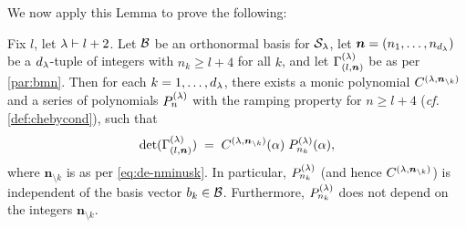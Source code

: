 We now apply this Lemma to prove the following:

\begin{lemma}\label{lem:pl} Fix $l$, let $\lambda \vdash l+2$. Let $\mathcal{B}$ be an orthonormal basis for $\mathcal{S}_\lambda$, let $\bm{n}=(n_1,\dots, n_{d_\lambda})$ be a $d_\lambda$-tuple of integers with $n_k\geq l+4$ for all $k$, and let $\Gamma_{(l,\bm{n})}^{(\lambda)}$ be as per \ref{par:bmn}. Then for each $k=1,\dots, d_\lambda$, there exists a monic polynomial $C^{(\lambda,\bm{n}_{\setminus k})}$ and a series of polynomials $P^{(\lambda)}_{n}$ with the ramping property for $n\geq l+4$ (\textit{cf.} \ref{def:chebycond}), such that 
\[ 
\text{det}(\Gamma_{(l,\bm{n})}^{(\lambda)}) \;=\; C^{(\lambda,\bm{n}_{\setminus k})}(\alpha) \; P^{(\lambda)}_{n_k}(\alpha),
\]
where $\bm{n}_{\setminus k}$ is as per \eqref{eq:de-nminusk}. In particular, $P^{(\lambda)}_{n_k}$ (and hence $C^{(\lambda,\bm{n}_{\setminus k})}$) is independent of the basis vector $b_k\in \mathcal{B}$. Furthermore, $P^{(\lambda)}_{n_k}$ does not depend on the integers $\bm{n}_{\setminus k}$.
\end{lemma}

